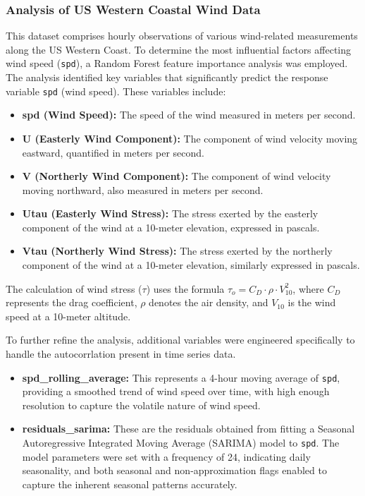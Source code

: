 \documentclass[12pt, twoside,hidelinks]{article}
\theoremstyle{definition}
\numberwithin{equation}{section}
\begin{document}
\subsubsection*{Analysis of US Western Coastal Wind Data}

This dataset comprises hourly observations of various wind-related measurements along the US Western Coast. To determine the most influential factors affecting wind speed (\texttt{spd}), a Random Forest feature importance analysis was employed. The analysis identified key variables that significantly predict the response variable \texttt{spd} (wind speed). These variables include:

\begin{itemize}
    \item \textbf{spd (Wind Speed):} The speed of the wind measured in meters per second.
    \item \textbf{U (Easterly Wind Component):} The component of wind velocity moving eastward, quantified in meters per second.
    \item \textbf{V (Northerly Wind Component):} The component of wind velocity moving northward, also measured in meters per second.
    \item \textbf{Utau (Easterly Wind Stress):} The stress exerted by the easterly component of the wind at a 10-meter elevation, expressed in pascals.
    \item \textbf{Vtau (Northerly Wind Stress):} The stress exerted by the northerly component of the wind at a 10-meter elevation, similarly expressed in pascals.
\end{itemize}

The calculation of wind stress (\(\tau\)) uses the formula \(\tau_o = C_D \cdot \rho \cdot V_{10}^2\), where \(C_D\) represents the drag coefficient, \(\rho\) denotes the air density, and \(V_{10}\) is the wind speed at a 10-meter altitude.

To further refine the analysis, additional variables were engineered specifically to handle the autocorrlation present in time series data. 
\begin{itemize}
    \item \textbf{spd\_rolling\_average:} This represents a 4-hour moving average of \texttt{spd}, providing a smoothed trend of wind speed over time, with high enough resolution to capture the volatile nature of wind speed.
    \item \textbf{residuals\_sarima:} These are the residuals obtained from fitting a Seasonal Autoregressive Integrated Moving Average (SARIMA) model to \texttt{spd}. The model parameters were set with a frequency of 24, indicating daily seasonality, and both seasonal and non-approximation flags enabled to capture the inherent seasonal patterns accurately.
\end{itemize}
\end{document}
